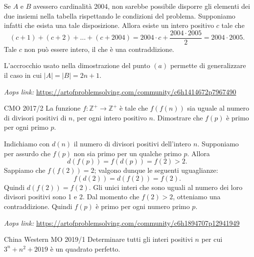 \documentclass{article}
\begin{document}
Se $A$ e $B$ avessero cardinalità 2004, non sarebbe possibile
disporre gli elementi dei due insiemi nella tabella rispettando le
condizioni del problema. Supponiamo infatti che esista una tale disposizione.
Allora esiste un intero positivo $c$ tale che
\begin{equation*}
	(c+1)+(c+2)+\dots+(c+2004)=2004\cdot c+\frac{2004\cdot 2005}{2}=2004\cdot 2005.
\end{equation*}
Tale $c$ non può essere intero, il che è una contraddizione.

\begin{remark*}{}{}
	L'accrocchio usato nella dimostrazione del punto $(a)$ permette
	di generalizzare il caso in cui $\vert A \vert=\vert B\vert=2n+1$.
\end{remark*}

\vspace{0.5cm}
\textit{Aops link:}
\href{https://artofproblemsolving.com/community/c6h1414672p7967490}
{https://artofproblemsolving.com/community/c6h1414672p7967490}
\begin{proposition}{CMO 2017/2}{}
	La funzione $f:\mathbb{Z}^+\rightarrow \mathbb{Z}^+$ è tale
	che $f(f(n))$ sia uguale al numero di divisori positivi di $n$,
	per ogni intero positivo $n$. Dimostrare che
	$f(p)$ è primo per ogni primo $p$.
\end{proposition}

Indichiamo con $d(n)$ il numero di divisori positivi dell'intero $n$.
Supponiamo per assurdo che $f(p)$ non sia primo per un qualche
primo $p$. Allora
\begin{equation*}
	d(f(p))=f(d(p))=f(2)>2.
\end{equation*}
Sappiamo che $f(f(2))=2$; valgono dunque le seguenti uguaglianze:
\begin{equation*}
	f(d(2))=d(f(2))=f(2).
\end{equation*}
Quindi $d(f(2))=f(2)$. Gli unici interi che sono uguali al numero
dei loro divisori positivi sono 1 e 2. Dal momento che
$f(2)>2$, otteniamo una contraddizione. Quindi $f(p)$ è primo
per ogni numero primo $p$.

\vspace{0.5cm}
\textit{Aops link:}
\href{https://artofproblemsolving.com/community/c6h1894707p12941949}
{https://artofproblemsolving.com/community/c6h1894707p12941949}

\begin{proposition}{China Western MO 2019/1}{}
	Determinare tutti gli interi positivi $n$ per cui
	$3^n+n^2+2019$ è un quadrato perfetto.
\end{proposition}
\end{document}
